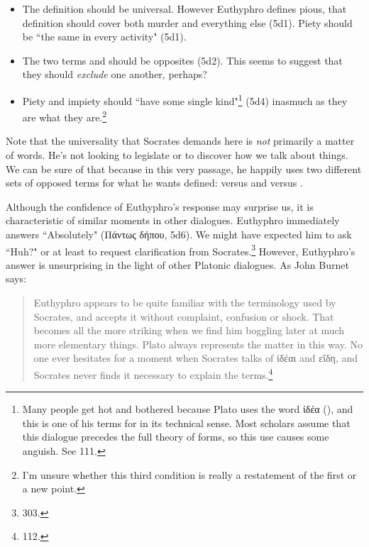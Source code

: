 \documentclass[11pt]{article}
\begin{document}
\begin{itemize}
    \item The definition should be universal.  However Euthyphro defines pious, that definition should cover both murder and everything else (5d1).  Piety should be ``the same in every activity" (5d1).
    \item The two terms  and  should be opposites (5d2).  This seems to suggest that they should \emph{exclude} one another, perhaps?
    \item Piety and impiety should ``have some single kind"\footnote{Many people get hot and bothered because Plato uses the word {\g ἰδέα} (), and this is one of his terms for  in its technical sense.  Most scholars assume that this dialogue precedes the full theory of forms, so this use causes some anguish.  See \citet{burnet1924} 111.} (5d4) inasmuch as they are what they are.\footnote{I'm unsure whether this third condition is really a restatement of the first or a new point.}
\end{itemize}

Note that the universality that Socrates demands here is \emph{not} primarily a matter of words.  He's not looking to legislate or to discover how we talk about things.  We can be sure of that because in this very passage, he happily uses two different sets of opposed terms for what he wants defined:  versus  and  versus .

Although the confidence of Euthyphro's response may surprise us, it is characteristic of similar moments in other dialogues.  Euthyphro immediately answers ``Absolutely" ({\g Πάντως δήπου}, 5d6).  We might have expected him to ask ``Huh?" or at least to request clarification from Socrates.\footnote{\citet{nehamas1975} 303.}  However, Euthyphro's answer is unsurprising in the light of other Platonic dialogues.  As John Burnet says:

\begin{quote}
    Euthyphro appears to be quite familiar with the terminology used by Socrates, and accepts it without complaint, confusion or shock.  That becomes all the more striking when we find him boggling later at much more elementary things.  Plato always represents the matter in this way.  No one ever hesitates for a moment when Socrates talks of {\g ἰδέαι} and {\g εἴδη}, and Socrates never finds it necessary to explain the terms.\footnote{\citet{burnet1924} 112.}
\end{quote}
\end{document}
